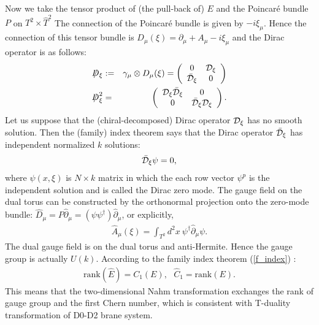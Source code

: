 \documentclass[a4paper,epsf,12pt]{article}
\newcommand{\ba}{\begin{array}}
\newcommand{\ea}{\end{array}}
\newcommand{\cD}{{\cal D}}
\newcommand{\del}{\partial}
\newcommand{\Dsl}{\mbox{\ooalign{\hfil/\hfil\crcr$D$}}}
\newcommand{\Ah}{\hat{A}}
\newcommand{\Ch}{\hat{C}}
\newcommand{\Dh}{\hat{D}}
\newcommand{\Fh}{\hat{F}}
\newcommand{\Th}{\hat{T}}
\newcommand{\delh}{\hat{\partial}}
\def \cD{{\cal D}}
\def \cDb{{\bar {\cal D}}}
\def \rank{\mathrm{rank}}
\def \Eh{\hat{E}}
\def \0{{\bf 0}}
\begin{document}
Now we take the tensor product of (the pull-back of) $E$ 
and the Poincar\'e bundle $P$ on $T^2 \times \Th^2$
The connection of the Poincar\'e bundle is given by $-i\xi_\mu$.
Hence the connection of this tensor bundle 
is $D_{\mu}(\xi)=\del_\mu+A_\mu-i\xi_\mu$
and the Dirac operator is as follows:
\begin{eqnarray*}
\Dsl_\xi &:=& \gamma_\mu \otimes D_{\mu}(\xi)=
\left(
\ba{cc}
0&\cD_\xi\\\cDb_\xi&0
\ea
\right)\\ 
\Dsl_\xi^2 &=&
\left(
\ba{cc}
\cD_\xi\cDb_\xi&0\\0&\cDb_\xi\cD_\xi
\ea
\right).
\end{eqnarray*}
Let us suppose that the (chiral-decomposed)
Dirac operator $\cD_\xi$ has no smooth solution.
Then the (family) index theorem says that 
the Dirac operator $\cDb_\xi$ has independent
normalized $k$ solutions:
\begin{eqnarray}
\label{dirac_02}
\cDb_\xi \psi =0,
\end{eqnarray}
where $\psi(x,\xi)$ is $N\times k$ matrix 
in which the each row vector $\psi^p$
is the independent solution and is called the Dirac zero mode.
The gauge field on the dual torus can be constructed by
the orthonormal projection onto the zero-mode bundle:
$
\Dh_\mu= P \delh_\mu=(\psi\psi^\dagger)\delh_\mu
$, or explicitly,
\begin{eqnarray}
\label{gauge_02}
\Ah_\mu(\xi) = \int_{T^2}d^2x~ \psi^\dagger\delh_\mu\psi. 
\end{eqnarray}
The dual gauge field is on the dual torus and anti-Hermite.
Hence the gauge group is actually $U(k)$.
According to the family index theorem (\ref{f_index}) :
\begin{eqnarray*}
\rank(\Eh)=C_1(E),~~~\Ch_1=\rank(E).
\end{eqnarray*}
This means that
the two-dimensional Nahm transformation
exchanges the rank of gauge group and the first Chern number,
which is consistent with T-duality transformation of D0-D2
brane system.
\end{document}
